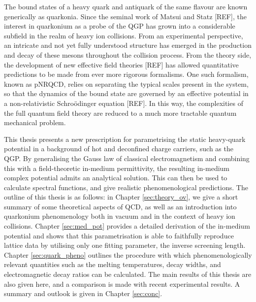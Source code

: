 \documentclass[12pt, a4paper, twoside]{book}
\begin{document}
The bound states of a heavy quark and antiquark of the same flavour are known generically as quarkonia. Since the seminal work of Matsui and Statz [REF], the interest in quarkonium as a probe of the QGP has grown into a considerable subfield in the realm of heavy ion collisions. From an experimental perspective, an intricate and not yet fully understood structure has emerged in the production and decay of these mesons throughout the collision process. From the theory side, the development of new effective field theories [REF] has allowed quantitative predictions to be made from ever more rigorous formalisms. One such formalism, known as pNRQCD, relies on separating the typical scales present in the system, so that the dynamics of the bound state are governed by an effective potential in a non-relativistic Schro{\"o}dinger equation [REF]. In this way, the complexities of the full quantum field theory are reduced to a much more tractable quantum mechanical problem.

This thesis presents a new prescription for parametrising the static heavy-quark potential in a background of hot and deconfined charge carriers, such as the QGP. By generalising the Gauss law of classical electromagnetism and combining this with a field-theoretic in-medium permittivity, the resulting in-medium complex potential admits an analytical solution. This can then be used to calculate spectral functions, and give realistic phenomenological predictions. The outline of this thesis is as follows: in Chapter \ref{sec:theory_ov}, we give a short summary of some theoretical aspects of QCD, as well as an introduction into quarkonium phenomenology both in vacuum and in the context of heavy ion collisions. Chapter \ref{sec:med_pot} provides a detailed derivation of the in-medium potential and shows that this parametrisation is able to faithfully reproduce lattice data by utilising only one fitting parameter, the inverse screening length. Chapter \ref{sec:quark_pheno} outlines the procedure with which phenomenologically relevant quantities such as the melting temperatures, decay widths, and electromagnetic decay ratios can be calculated. The main results of this thesis are also given here, and a comparison is made with recent experimental results. A summary and outlook is given in Chapter \ref{sec:conc}. 

\end{document}
